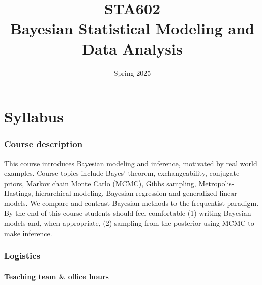 \documentclass[
  letterpaper,
  DIV=11,
  numbers=noendperiod]{scrartcl}
\title{STA602\\
Bayesian Statistical Modeling and Data Analysis}
\subtitle{Spring 2025}
\author{}
\date{}
\let\oldparagraph\paragraph
\renewcommand{\paragraph}[1]{\oldparagraph{#1}\mbox{}}
\begin{document}
\maketitle
\ifdefined\Shaded\renewenvironment{Shaded}{\begin{tcolorbox}[sharp corners, enhanced, interior hidden, borderline west={3pt}{0pt}{shadecolor}, frame hidden, breakable, boxrule=0pt]}{\end{tcolorbox}}\fi

\hypertarget{syllabus}{%
\section{Syllabus}\label{syllabus}}

\hypertarget{course-description}{%
\subsubsection{Course description}\label{course-description}}

This course introduces Bayesian modeling and inference, motivated by
real world examples. Course topics include Bayes' theorem,
exchangeability, conjugate priors, Markov chain Monte Carlo (MCMC),
Gibbs sampling, Metropolis-Hastings, hierarchical modeling, Bayesian
regression and generalized linear models. We compare and contrast
Bayesian methods to the frequentist paradigm. By the end of this course
students should feel comfortable (1) writing Bayesian models and, when
appropriate, (2) sampling from the posterior using MCMC to make
inference.

\hypertarget{logistics}{%
\subsubsection{Logistics}\label{logistics}}

\hypertarget{teaching-team-office-hours}{%
\paragraph{Teaching team \& office
hours}\label{teaching-team-office-hours}}
\end{document}
